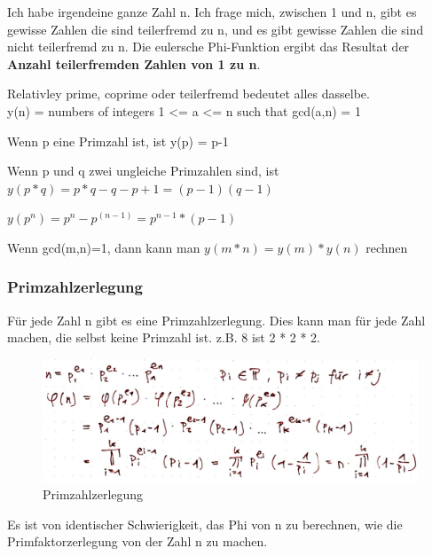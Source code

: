 Ich habe irgendeine ganze Zahl n. Ich frage mich, zwischen 1 und n, gibt
es gewisse Zahlen die sind teilerfremd zu n, und es gibt gewisse Zahlen
die sind nicht teilerfremd zu n. Die eulersche Phi-Funktion ergibt das
Resultat der \textbf{Anzahl teilerfremden Zahlen von 1 zu n}.

\begin{tcolorbox}[colback=red!5!white,colframe=red!75!black]
Relativley prime, coprime oder teilerfremd bedeutet alles dasselbe. \\
y(n) = numbers of integers 1 <= a <= n such that gcd(a,n) = 1
\end{tcolorbox}

\begin{tcolorbox}[colback=red!5!white,colframe=red!75!black]
Wenn p eine Primzahl ist, ist y(p) = p-1 

Wenn p und q zwei ungleiche Primzahlen sind, ist $y(p*q) = p * q - q - p + 1 = (p-1)(q-1)$

$y(p^n) = p^n - p^{(n-1)} = p^{n-1} *(p-1)$

Wenn gcd(m,n)=1, dann kann man $y(m * n) = y(m) * y(n)$ rechnen
\end{tcolorbox}

\hypertarget{primzahlzerlegung}{%
\subsubsection{Primzahlzerlegung}\label{primzahlzerlegung}}

Für jede Zahl n gibt es eine Primzahlzerlegung. Dies kann man für jede
Zahl machen, die selbst keine Primzahl ist. z.B. 8 ist 2 * 2 * 2.

\begin{figure}[H]
\centering
\includegraphics[width=1\textwidth]{figures/primzahlZerlegung.png}
\caption{Primzahlzerlegung}
\end{figure}

\begin{tcolorbox}[colback=red!5!white,colframe=red!75!black]
Es ist von identischer Schwierigkeit, das Phi von n zu berechnen, wie die Primfaktorzerlegung von der Zahl n zu machen.
\end{tcolorbox}

